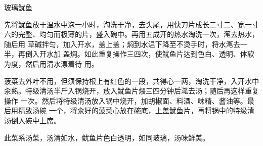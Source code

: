 %
%
%
%
%
%
%
\begin{recipe}{玻璃鱿鱼}

\ingredients


\preparation

\step 先将鱿鱼放于温水中泡一小时，淘洗干净，去头尾，用快刀片成长二寸二、宽一寸
六的完整、均匀而极薄的片，盛入碗中。再用五成开的热水淘洗一次，滗去热水，随后用
草碱拌匀，加入开水，盖上盖；焖到水温下降至不烫手时，将水滗去一半，再倒入开水加
盖焖。如此重复操作三四次，使鱿鱼片达到色白、透明、体软为度，然后用清水漂着待
用。

\step 菠菜去外叶不用，但须保持根上有红色的一段，共得心一两，淘洗干净，入开水中
汆熟。特级清汤半斤入锅烧开，放入鱿鱼片煨三四分钟后滗去汤；随后再这样重复操作
一次。然后将特级清汤放入锅中烧开，加胡椒面、料酒、味精、酱油等。最后用精致汤碗
一个，将汆好的菠菜心放在碗底，上盖鱿鱼片，再将锅中的特级清汤倒入碗中上席。

\features

此菜系汤菜，汤清如水，鱿鱼片色白透明，如同玻璃，汤味鲜美。

\end{recipe}


